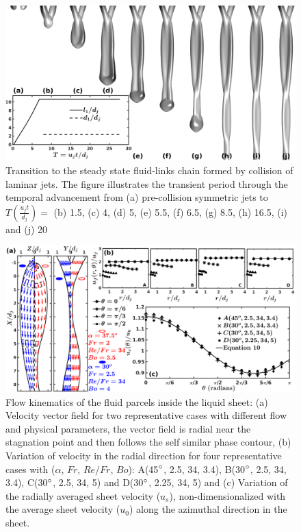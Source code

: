 \documentclass{jfm}
\begin{document}
\clearpage
\begin{figure}
	\centering
	\includegraphics[width=\linewidth]{Figure3}
	\caption{Transition to the steady state fluid-links chain formed by collision of laminar jets. The figure illustrates the transient period through the temporal advancement from (a) pre-collision symmetric jets to $T (\frac{u_jt}{d_j}) = $ (b) 1.5, (c) 4, (d) 5, (e) 5.5, (f) 6.5, (g) 8.5, (h) 16.5, (i) and (j) 20}
	\label{Figure::transient}
\end{figure}
\clearpage
\begin{figure}
	\centering
	\includegraphics[width=\linewidth]{Figure4}
	\caption{Flow kinematics of the fluid parcels inside the liquid sheet: (a) Velocity vector field for two representative cases with different flow and physical parameters, the vector field is radial near the stagnation point and then follows the self similar phase contour, (b) Variation of velocity in the radial direction for four representative cases with ($\alpha$, $Fr$, $Re/Fr$, $Bo$): A(45$\degree$, 2.5, 34, 3.4), B(30$\degree$, 2.5, 34, 3.4), C(30$\degree$, 2.5, 34, 5) and D(30$\degree$, 2.25, 34, 5) and (c) Variation of the radially averaged sheet velocity ($u_s$), non-dimensionalized with the average sheet velocity ($u_0$) along the azimuthal direction in the sheet.}
	\label{Figure::velocityVectors}
\end{figure}
\end{document}
